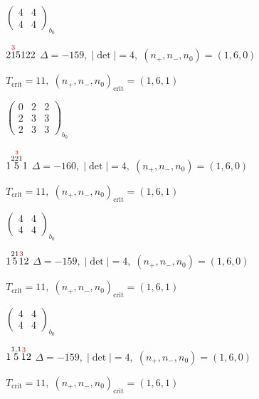 \documentclass[10pt]{article}
\begin{document}
\hspace{2em}$\left(\begin{smallmatrix}4 & 4 \\ 4 & 4\end{smallmatrix}\right)_{\!b_0}$

$2\overset{\textcolor{red}{3}}{1}5122$ \quad $\Delta=-159,\; |\det|=4,\; (n_+,n_-,n_0)=(1,6,0)$

\hspace{1em}$T_{\text{crit}}=11,\; (n_+,n_-,n_0)_{\text{crit}}=(1,6,1)$

\hspace{2em}$\left(\begin{smallmatrix}0 & 2 & 2 \\ 2 & 3 & 3 \\ 2 & 3 & 3\end{smallmatrix}\right)_{\!b_0}$

\smallskip

$1\overset{2\overset{\textcolor{red}{3}}{2}1}{5}1$ \quad $\Delta=-160,\; |\det|=4,\; (n_+,n_-,n_0)=(1,6,0)$

\hspace{1em}$T_{\text{crit}}=11,\; (n_+,n_-,n_0)_{\text{crit}}=(1,6,1)$

\hspace{2em}$\left(\begin{smallmatrix}4 & 4 \\ 4 & 4\end{smallmatrix}\right)_{\!b_0}$

\smallskip

$1\overset{21}{5}\overset{\textcolor{red}{3}}{1}2$ \quad $\Delta=-159,\; |\det|=4,\; (n_+,n_-,n_0)=(1,6,0)$

\hspace{1em}$T_{\text{crit}}=11,\; (n_+,n_-,n_0)_{\text{crit}}=(1,6,1)$

\hspace{2em}$\left(\begin{smallmatrix}4 & 4 \\ 4 & 4\end{smallmatrix}\right)_{\!b_0}$

\smallskip

$1\overset{1,1}{5}\overset{\textcolor{red}{3}}{1}2$ \quad $\Delta=-159,\; |\det|=4,\; (n_+,n_-,n_0)=(1,6,0)$

\hspace{1em}$T_{\text{crit}}=11,\; (n_+,n_-,n_0)_{\text{crit}}=(1,6,1)$
\end{document}
